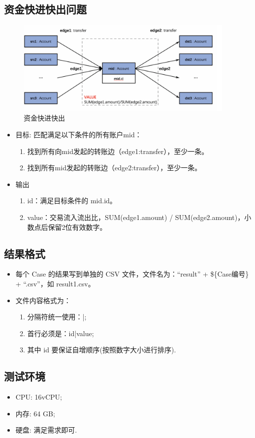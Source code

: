 \subsection{资金快进快出问题}
\begin{figure}[H]
  \begin{center}
    \includegraphics[width=0.95\textwidth]{./figures/蚂蚁改6-546936.png}
  \end{center}
  \caption{资金快进快出}
\end{figure}

\begin{itemize}
  \item 目标: 匹配满足以下条件的所有账户mid：
    \begin{enumerate}
      \item 找到所有向mid发起的转账边（edge1:transfer），至少一条。
      \item 找到所有mid发起的转账边（edge2:transfer），至少一条。
    \end{enumerate}
  \item 输出
    \begin{enumerate}
      \item id：满足目标条件的 mid.id。
      \item value：交易流入流出比，SUM(edge1.amount) / SUM(edge2.amount)，小数点后保留2位有效数字。
    \end{enumerate}
\end{itemize}

\subsection{结果格式}
\begin{itemize}
  \item 每个 Case 的结果写到单独的 CSV 文件，文件名为：``result'' + \$\{Case编号\} +
    ``.csv''，如 result1.csv。
  \item 文件内容格式为：
    \begin{enumerate}
      \item 分隔符统一使用：|;
      \item 首行必须是：id|value;
      \item 其中 id 要保证自增顺序(按照数字大小进行排序).
    \end{enumerate}
\end{itemize}

\subsection{测试环境}
\begin{itemize}
  \item CPU: 16vCPU;
  \item 内存: 64 GB;
  \item 硬盘: 满足需求即可.
\end{itemize}
